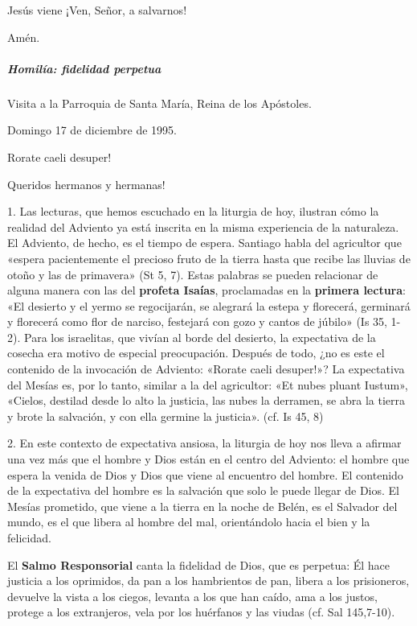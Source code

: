 \documentclass[]{article}
\let\oldsubparagraph\subparagraph
\renewcommand{\subparagraph}[1]{\oldsubparagraph{#1}\mbox{}}
\begin{document}
Jesús viene ¡Ven, Señor, a salvarnos!

Amén.

\subparagraph{Homilía: fidelidad
perpetua}\label{homiluxeda-fidelidad-perpetua}

Visita a la Parroquia de Santa María, Reina de los Apóstoles.

Domingo 17 de diciembre de 1995.

Rorate caeli desuper!

Queridos hermanos y hermanas!

1. Las lecturas, que hemos escuchado en la liturgia de hoy, ilustran
cómo la realidad del Adviento ya está inscrita en la misma experiencia
de la naturaleza. El Adviento, de hecho, es el tiempo de espera.
Santiago habla del agricultor que «espera pacientemente el precioso
fruto de la tierra hasta que recibe las lluvias de otoño y las de
primavera» (St 5, 7). Estas palabras se pueden relacionar de alguna
manera con las del \textbf{profeta Isaías}, proclamadas en la
\textbf{primera lectura}: «El desierto y el yermo se regocijarán, se
alegrará la estepa y florecerá, germinará y florecerá como flor de
narciso, festejará con gozo y cantos de júbilo» (Is 35, 1-2). Para los
israelitas, que vivían al borde del desierto, la expectativa de la
cosecha era motivo de especial preocupación. Después de todo, ¿no es
este el contenido de la invocación de Adviento: «Rorate caeli desuper!»?
La expectativa del Mesías es, por lo tanto, similar a la del agricultor:
«Et nubes pluant Iustum», «Cielos, destilad desde lo alto la justicia,
las nubes la derramen, se abra la tierra y brote la salvación, y con
ella germine la justicia». (cf. Is 45, 8)

2. En este contexto de expectativa ansiosa, la liturgia de hoy nos lleva
a afirmar una vez más que el hombre y Dios están en el centro del
Adviento: el hombre que espera la venida de Dios y Dios que viene al
encuentro del hombre. El contenido de la expectativa del hombre es la
salvación que solo le puede llegar de Dios. El Mesías prometido, que
viene a la tierra en la noche de Belén, es el Salvador del mundo, es el
que libera al hombre del mal, orientándolo hacia el bien y la felicidad.

El \textbf{Salmo Responsorial} canta la fidelidad de Dios, que es
perpetua: Él hace justicia a los oprimidos, da pan a los hambrientos de
pan, libera a los prisioneros, devuelve la vista a los ciegos, levanta a
los que han caído, ama a los justos, protege a los extranjeros, vela por
los huérfanos y las viudas (cf. Sal 145,7-10).
\end{document}
